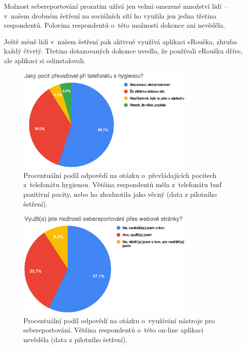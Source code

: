 Možnost sebereportování prozatím užívá jen velmi omezené množství lidí – v~na\-šem drobném šetření na sociálních sítí ho využila jen jedna třetina respondentů. Polovina respondentů o~této možnosti dokonce ani nevěděla. 

Ještě méně lidí v~našem šetření pak aktivně využívá aplikaci eRouška, zhruba každý čtvrtý. Třetina dotazovaných dokonce uvedla, že používali eRoušku dříve, ale aplikaci si odinstalovali.

\pagebreak
\begin{figure}[h!]
\begin{center}
    \includegraphics[width=250pt]{./pic/graf1.eps}
\end{center}    
\caption{Procentuální podíl odpovědí na otázku o~převládajících pocitech z~telefonátu  hygienou. Většina respondentů měla z~telefonátu buď pozitivní pocity, nebo ho zhodnotila jako věcný (data z pilotního šetření).}
 \end{figure}
\begin{figure}[h!]
\begin{center}
    \includegraphics[width=250pt]{./pic/graf2.eps}
 \end{center}    
    \caption{Procentuální podíl odpovědí na otázku o~využívání nástroje pro sebereportování. Většina respondentů o~této on-line aplikaci nevěděla (data z pilotního šetření).}
\end{figure}
